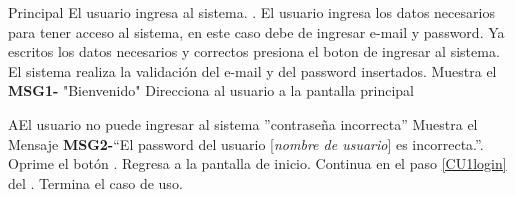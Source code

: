 	\begin{UCtrayectoria}{Principal}
		\UCpaso[\UCactor] El usuario ingresa al sistema.  \label{CU17Login}.
		\UCpaso[\UCactor] El usuario ingresa los datos necesarios para tener acceso al sistema, en este caso debe de ingresar e-mail y password.\label{CU1login} %
		\UCpaso[\UCactor] Ya escritos los datos necesarios y correctos presiona el boton de ingresar al sistema.%
		\UCpaso El sistema realiza la validación del e-mail y del password insertados.%
		\UCpaso Muestra el {\bf MSG1-} "Bienvenido"%
		\UCpaso Direcciona al usuario a la pantalla principal %
		
	\end{UCtrayectoria}
		
		\begin{UCtrayectoriaA}{A}{El usuario no puede ingresar al sistema ''contrase\~na incorrecta''}
			\UCpaso Muestra el Mensaje {\bf MSG2-}``El password del usuario [{\em nombre de usuario}] es incorrecta.''.
			\UCpaso[\UCactor] Oprime el botón .
			\UCpaso Regresa a la pantalla de inicio. 
			\UCpaso Continua en el paso \ref{CU1login} del .
			\UCpaso[] Termina el caso de uso.
		\end{UCtrayectoriaA}
		
